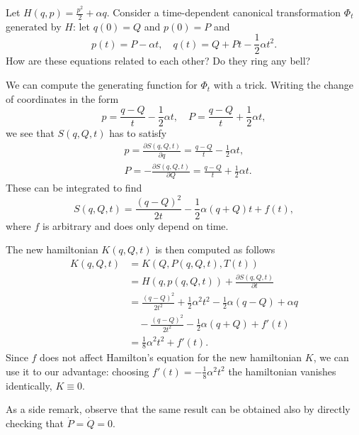 \documentclass[english,fontsize=11pt,paper=a5,oneside]{scrbook}
\theoremstyle{definition}
\newenvironment{example}
  {\pushQED{\qed}\renewcommand{\qedsymbol}{$\lozenge$}\examplex}
  {\popQED\endexamplex}
\begin{document}
\begin{example}
  Let $H(q,p) = \frac{p^2}{2} + \alpha q$. Consider a time-dependent canonical transformation $\Phi_t$ generated by $H$: let $q(0) = Q$ and $p(0) = P$ and
  \begin{equation}\label{eq:unifaccm}
    p(t) = P - \alpha t, \quad
    q(t) = Q + Pt - \frac{1}{2}\alpha t^2.
  \end{equation}
  How are these equations related to each other? Do they ring any bell?

  We can compute the generating function for $\Phi_t$ with a trick. Writing the change of coordinates in the form
  \begin{equation}
    p = \frac{q-Q}{t}-\frac12\alpha t, \quad
    P = \frac{q-Q}{t} + \frac 12\alpha t,
  \end{equation}
  we see that $S(q,Q,t)$ has to satisfy
  \begin{align}
     & p = \frac{\partial S(q,Q,t)}{\partial q} = \frac{q-Q}{t} - \frac12\alpha t,   \\
     & P = - \frac{\partial S(q,Q,t)}{\partial Q} = \frac{q-Q}{t} + \frac12\alpha t.
  \end{align}
  These can be integrated to find
  \begin{equation}
    S(q,Q,t) = \frac{(q-Q)^2}{2t} - \frac12 \alpha (q+Q) t + f(t),
  \end{equation}
  where $f$ is arbitrary and does only depend on time.

  The new hamiltonian $K(q,Q,t)$ is then computed as follows
  \begin{align}
    K(q,Q,t) & = K(Q, P(q,Q,t), T(t))                                                          \\
             & = H(q, p(q,Q,t)) + \frac{\partial S (q,Q,t)}{\partial t}                        \\
             & = \frac{(q-Q)^2}{2t^2} + \frac12 \alpha^2 t^2 - \frac12 \alpha (q-Q) + \alpha q \\
             & \quad - \frac{(q-Q)^2}{2t^2} - \frac12 \alpha(q+Q) + f'(t)                      \\
             & = \frac{1}{8}\alpha^2t^2 + f'(t).
  \end{align}
  Since $f$ does not affect Hamilton's equation for the new hamiltonian $K$, we can use it to our advantage: choosing $f'(t) = - \frac{1}{8}\alpha^2t^2$ the hamiltonian vanishes identically, $K\equiv 0$.

  As a side remark, observe that the same result can be obtained also by directly checking that $\dot P = \dot Q = 0$.
\end{example}
\end{document}
